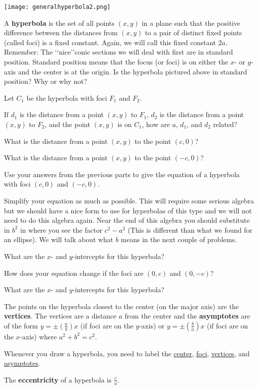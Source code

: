 \begin{center} \texttt{[image: generalhyperbola2.png]} \end{center}

\begin{info} A \textbf{hyperbola} is the set of all points $(x,y)$ in a plane such that the positive difference  between the distances from $(x,y)$ to a pair of distinct fixed points (called foci) is a fixed constant. Again, we will call this fixed constant $2a$.
Remember:  The \lq\lq nice\rq\rq conic sections we will deal with first are in standard position.
Standard position means that the focus (or foci) is on either the $x$- or $y$-axis and the center is at the origin. Is the hyperbola pictured above in standard position? Why or why not?
\end{info}

\bq Let $C_1$ be the hyperbola with foci $F_1$ and $F_2$.
\be
\item If $d_1$ is the distance from a point $(x,y)$ to $F_1$, $d_2$ is the distance from a point $(x,y)$ to $F_2$, and the point $(x,y)$ is on $C_1$, how are $a$, $d_1$, and $d_2$ related?
\item What is the distance from a point $(x,y)$ to the point $(c,0)$?
\item What is the distance from a point $(x,y)$ to the point $(-c,0)$?
\item Use your answers from the previous parts to give the equation of a hyperbola with foci $(c,0)$ and $(-c,0)$.
\item Simplify your equation as much as possible. This will require some serious algebra but we should have a nice form to use for hyperbolas of this type and we will not need to do this algebra again. Near the end of this algebra you should substitute in $b^2$ in where you see the factor $c^2-a^2$ (This is different than what we found for an ellipse). We will talk about what $b$ means in the next couple of problems.
\item What are the $x$- and $y$-intercepts for this hyperbola?
\ee \eq

\bq \be
\item How does your equation change if the foci are $(0,c)$ and $(0,-c)$?
\item What are the $x$- and $y$-intercepts for this hyperbola?
\ee \eq

\begin{info}
The points on the hyperbola closest to the center (on the major axis) are the \textbf{vertices}. The vertices are a distance $a$ from the center and the \textbf{asymptotes} are of the form $y=\pm(\frac{a}{b}) x$ (if foci are on the $y$-axis) or $y=\pm(\frac{b}{a}) x$ (if foci are on the $x$-axis) where $a^2+b^2=c^2$.

Whenever you draw a hyperbola, you need to label the \underline{center}, \underline{foci}, \underline{vertices}, and \underline{asymptotes}.

The \textbf{eccentricity} of a hyperbola is $\frac{c}{a}$. \end{info}

